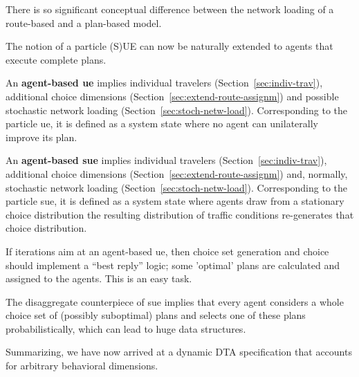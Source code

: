 There is so significant conceptual difference between the network loading of
a route-based and a plan-based model.

The notion of a particle (S)UE can now be naturally extended to agents 
that execute complete plans.

An \textbf{agent-based \gls{ue}} implies individual travelers
(Section~\ref{sec:indiv-trav}), additional choice dimensions
(Section~\ref{sec:extend-route-assignm}) and possible stochastic network
loading (Section~\ref{sec:stoch-netw-load}).  Corresponding to the
particle \gls{ue}, it is defined as a system state where no agent can
unilaterally improve its plan.

An \textbf{agent-based \gls{sue}} implies individual travelers
(Section~\ref{sec:indiv-trav}), additional choice dimensions
(Section~\ref{sec:extend-route-assignm})\corr{,}{} and, normally, stochastic
network loading (Section~\ref{sec:stoch-netw-load}).  Corresponding to the
particle \gls{sue}, it is defined as a system state where agents draw from a
stationary choice distribution  the resulting distribution of
traffic conditions re-generates that choice distribution.

If  iterations aim at an agent-based \gls{ue}, then choice set
generation and choice should implement a ``best reply'' logic; some
'optimal' plans are calculated and assigned to the agents. This
is  an easy task.  

The disaggregate counterpiece of 
\gls{sue} implies that every agent considers a whole choice set of (possibly
suboptimal) plans and selects one of these plans probabilistically,
which can lead to huge data structures.

Summarizing, we have now arrived at a  dynamic DTA
specification that accounts for arbitrary behavioral dimensions. 

